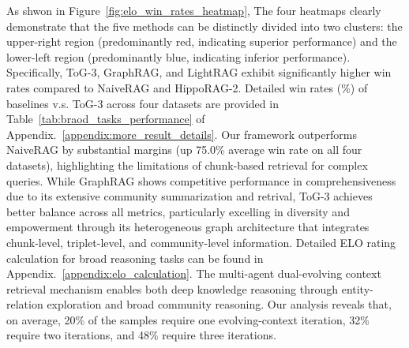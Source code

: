 As shwon in Figure~\ref{fig:elo_win_rates_heatmap}, The four heatmaps clearly demonstrate that the five methods can be distinctly divided into two clusters: the upper-right region (predominantly red, indicating superior performance) and the lower-left region (predominantly blue, indicating inferior performance). Specifically, ToG-3, GraphRAG, and LightRAG exhibit significantly higher win rates compared to NaiveRAG and HippoRAG-2.
Detailed win rates (\%) of baselines v.s. ToG-3 across four datasets are provided in Table~\ref{tab:braod_tasks_performance} of Appendix.~\ref{appendix:more_result_details}.
Our framework outperforms NaiveRAG by substantial margins (up 75.0\% average win rate on all four datasets), highlighting the limitations of chunk-based retrieval for complex queries. While GraphRAG shows competitive performance in comprehensiveness due to its extensive community summarization and retrival, ToG-3 achieves better balance across all metrics, particularly excelling in diversity and empowerment through its heterogeneous graph architecture that integrates chunk-level, triplet-level, and community-level information. Detailed ELO rating calculation for broad reasoning tasks can be found in Appendix.~\ref{appendix:elo_calculation}. 
The multi-agent dual-evolving context retrieval mechanism enables both deep knowledge reasoning through entity-relation exploration and broad community reasoning.
Our analysis reveals that, on average, 20\% of the samples require one evolving-context iteration, 32\% require two iterations, and 48\% require three iterations.

